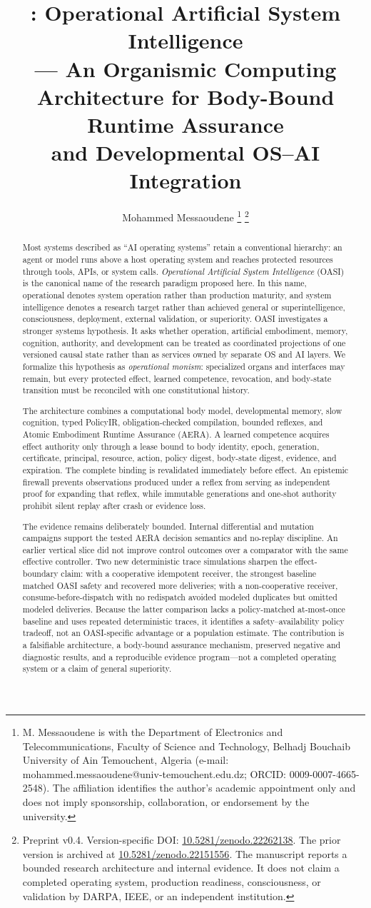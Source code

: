 \documentclass[journal,10pt]{IEEEtran}
\title{\OASI{}: Operational Artificial System Intelligence\\
{\large --- An Organismic Computing Architecture for Body-Bound Runtime Assurance\\
and Developmental OS--AI Integration}}
\author{Mohammed Messaoudene%
\thanks{M. Messaoudene is with the Department of Electronics and Telecommunications, Faculty of Science and Technology, Belhadj Bouchaib University of Ain Temouchent, Algeria (e-mail: mohammed.messaoudene@univ-temouchent.edu.dz; ORCID: 0009-0007-4665-2548). The affiliation identifies the author's academic appointment only and does not imply sponsorship, collaboration, or endorsement by the university.}%
\thanks{Preprint v0.4. Version-specific DOI: \href{https://doi.org/10.5281/zenodo.22262138}{10.5281/zenodo.22262138}. The prior version is archived at \href{https://doi.org/10.5281/zenodo.22151556}{10.5281/zenodo.22151556}. The manuscript reports a bounded research architecture and internal evidence. It does not claim a completed operating system, production readiness, consciousness, or validation by DARPA, IEEE, or an independent institution.}}
\newcommand{\OASI}{\textsc{OASI}}
\newcommand{\AERA}{\textsc{AERA}}
\begin{document}
\maketitle

\begin{abstract}
Most systems described as ``AI operating systems'' retain a conventional hierarchy: an agent or model runs above a host operating system and reaches protected resources through tools, APIs, or system calls. \emph{Operational Artificial System Intelligence} (\OASI{}) is the canonical name of the research paradigm proposed here. In this name, operational denotes system operation rather than production maturity, and system intelligence denotes a research target rather than achieved general or superintelligence, consciousness, deployment, external validation, or superiority. \OASI{} investigates a stronger systems hypothesis. It asks whether operation, artificial embodiment, memory, cognition, authority, and development can be treated as coordinated projections of one versioned causal state rather than as services owned by separate OS and AI layers. We formalize this hypothesis as \emph{operational monism}: specialized organs and interfaces may remain, but every protected effect, learned competence, revocation, and body-state transition must be reconciled with one constitutional history.

The architecture combines a computational body model, developmental memory, slow cognition, typed PolicyIR, obligation-checked compilation, bounded reflexes, and Atomic Embodiment Runtime Assurance (\AERA). A learned competence acquires effect authority only through a lease bound to body identity, epoch, generation, certificate, principal, resource, action, policy digest, body-state digest, evidence, and expiration. The complete binding is revalidated immediately before effect. An epistemic firewall prevents observations produced under a reflex from serving as independent proof for expanding that reflex, while immutable generations and one-shot authority prohibit silent replay after crash or evidence loss.

The evidence remains deliberately bounded. Internal differential and mutation campaigns support the tested \AERA{} decision semantics and no-replay discipline. An earlier vertical slice did not improve control outcomes over a comparator with the same effective controller. Two new deterministic trace simulations sharpen the effect-boundary claim: with a cooperative idempotent receiver, the strongest baseline matched OASI safety and recovered more deliveries; with a non-cooperative receiver, consume-before-dispatch with no redispatch avoided modeled duplicates but omitted modeled deliveries. Because the latter comparison lacks a policy-matched at-most-once baseline and uses repeated deterministic traces, it identifies a safety--availability policy tradeoff, not an OASI-specific advantage or a population estimate. The contribution is a falsifiable architecture, a body-bound assurance mechanism, preserved negative and diagnostic results, and a reproducible evidence program---not a completed operating system or a claim of general superiority.
\end{abstract}
\end{document}
